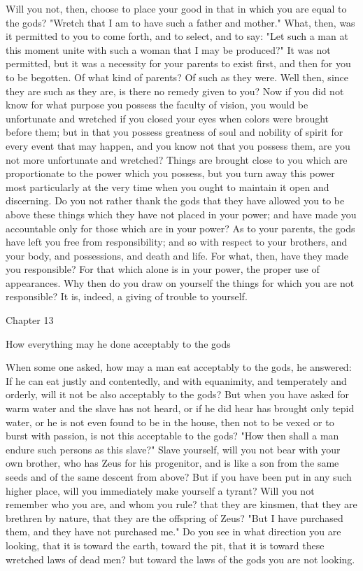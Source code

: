 \documentclass[a4paper]{article}
\begin{document}
Will you not, then, choose to place your good in that in which you
are equal to the gods? "Wretch that I am to have such a father and
mother." What, then, was it permitted to you to come forth, and to
select, and to say: "Let such a man at this moment unite with such
a woman that I may be produced?" It was not permitted, but it was
a necessity for your parents to exist first, and then for you to be
begotten. Of what kind of parents? Of such as they were. Well then,
since they are such as they are, is there no remedy given to you?
Now if you did not know for what purpose you possess the faculty of
vision, you would be unfortunate and wretched if you closed your eyes
when colors were brought before them; but in that you possess greatness
of soul and nobility of spirit for every event that may happen, and
you know not that you possess them, are you not more unfortunate and
wretched? Things are brought close to you which are proportionate
to the power which you possess, but you turn away this power most
particularly at the very time when you ought to maintain it open and
discerning. Do you not rather thank the gods that they have allowed
you to be above these things which they have not placed in your power;
and have made you accountable only for those which are in your power?
As to your parents, the gods have left you free from responsibility;
and so with respect to your brothers, and your body, and possessions,
and death and life. For what, then, have they made you responsible?
For that which alone is in your power, the proper use of appearances.
Why then do you draw on yourself the things for which you are not
responsible? It is, indeed, a giving of trouble to yourself.

Chapter 13

How everything may he done acceptably to the gods 

When some one asked, how may a man eat acceptably to the gods, he
answered: If he can eat justly and contentedly, and with equanimity,
and temperately and orderly, will it not be also acceptably to the
gods? But when you have asked for warm water and the slave has not
heard, or if he did hear has brought only tepid water, or he is not
even found to be in the house, then not to be vexed or to burst with
passion, is not this acceptable to the gods? "How then shall a man
endure such persons as this slave?" Slave yourself, will you not bear
with your own brother, who has Zeus for his progenitor, and is like
a son from the same seeds and of the same descent from above? But
if you have been put in any such higher place, will you immediately
make yourself a tyrant? Will you not remember who you are, and whom
you rule? that they are kinsmen, that they are brethren by nature,
that they are the offspring of Zeus? "But I have purchased them, and
they have not purchased me." Do you see in what direction you are
looking, that it is toward the earth, toward the pit, that it is toward
these wretched laws of dead men? but toward the laws of the gods you
are not looking. 
\end{document}
